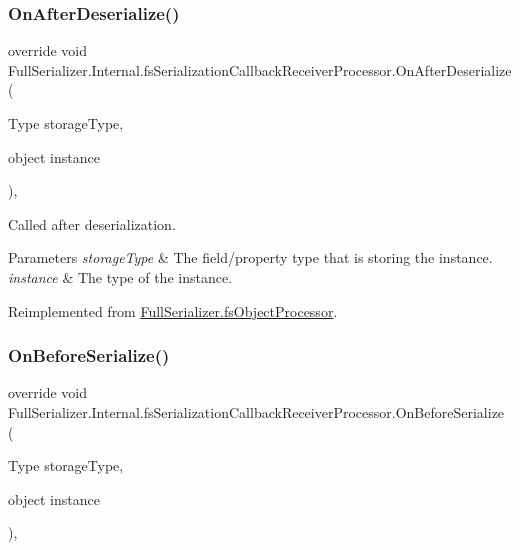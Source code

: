 \subsubsection{\texorpdfstring{On\+After\+Deserialize()}{OnAfterDeserialize()}}
{\footnotesize\ttfamily override void Full\+Serializer.\+Internal.\+fs\+Serialization\+Callback\+Receiver\+Processor.\+On\+After\+Deserialize (\begin{DoxyParamCaption}\item[{Type}]{storage\+Type,  }\item[{object}]{instance }\end{DoxyParamCaption})\hspace{0.3cm}{\ttfamily [inline]}, {\ttfamily [virtual]}}



Called after deserialization. 


\begin{DoxyParams}{Parameters}
{\em storage\+Type} & The field/property type that is storing the instance.\\
\hline
{\em instance} & The type of the instance.\\
\hline
\end{DoxyParams}


Reimplemented from \hyperlink{class_full_serializer_1_1fs_object_processor_a147c5f6828b9cf92703152ee7e1611dd}{Full\+Serializer.\+fs\+Object\+Processor}.

\mbox{\label{class_full_serializer_1_1_internal_1_1fs_serialization_callback_receiver_processor_a8013e3b964d24ee85c19fcd33997c104}} 
\subsubsection{\texorpdfstring{On\+Before\+Serialize()}{OnBeforeSerialize()}}
{\footnotesize\ttfamily override void Full\+Serializer.\+Internal.\+fs\+Serialization\+Callback\+Receiver\+Processor.\+On\+Before\+Serialize (\begin{DoxyParamCaption}\item[{Type}]{storage\+Type,  }\item[{object}]{instance }\end{DoxyParamCaption})\hspace{0.3cm}{\ttfamily [inline]}, {\ttfamily [virtual]}}



